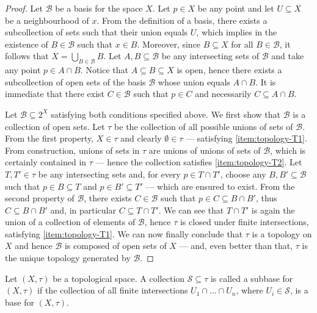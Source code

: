\begin{proof}
Let \(\mathcal{B}\) be a basis for the space \(X\). Let \(p \in X\) be any point
and let \(U \subseteq X\) be a neighbourhood of \(x\). From the definition of a
basis, there exists a subcollection of sets such that their union equals
\(U\), which implies in the existence of \(B \in \mathcal B\) such that \(x \in
B\). Moreover, since \(B \subseteq X\) for all \(B \in \mathcal B\), it follows
that \(X = \bigcup_{B \in \mathcal B} B\). Let \(A, B \subseteq \mathcal B\) be
any intersecting sets of \(\mathcal B\) and take any point \(p \in A \cap
B\). Notice that \(A \subseteq B \subseteq X\) is open, hence there exists a
subcollection of open sets of the basis \(\mathcal B\) whose union equals \(A
\cap B\). It is immediate that there exist \(C \in \mathcal B\) such that \(p
\in C\) and necessarily \(C \subseteq A \cap B\).

Let \(\mathcal B \subseteq 2^X\) satisfying both conditions specified above. We
first show that \(\mathcal B\) is a collection of open sets. Let \(\tau\)
be the collection of all possible unions of sets of \(\mathcal B\). From the
first property, \(X \in \tau\) and clearly \(\emptyset \in \tau\)
--- satisfying \cref{item:topology-T1}. From construction, unions of sets in
\(\tau\) are unions of unions of sets of \(\mathcal B\), which is
certainly contained in \(\tau\) --- hence the collection satisfies
\cref{item:topology-T2}. Let \(T, T' \in \tau\) be any intersecting sets
and, for every \(p \in T \cap T'\), choose any \(B, B' \subseteq \mathcal B\)
such that \(p \in B \subseteq T\) and \(p \in B' \subseteq T'\) --- which are
ensured to exist. From the second property of \(\mathcal B\), there exists \(C
\in \mathcal B\) such that \(p \in C \subseteq B \cap B'\), thus \(C \subseteq B
\cap B'\) and, in particular \(C \subseteq T \cap T'\). We can see that \(T \cap
T'\) is again the union of a collection of elements of \(\mathcal B\), hence
\(\tau\) is closed under finite intersections, satisfying
\cref{item:topology-T1}. We can now finally conclude that \(\tau\) is a
topology on \(X\) and hence \(\mathcal B\) is composed of open sets of \(X\) ---
and, even better than that, \(\tau\) is the unique topology generated by
\(\mathcal B\).
\end{proof}

\begin{definition}[Subbase]\label{def: subbase}
Let \((X, \tau)\) be a topological space. A collection \(\mathcal S
\subseteq \tau\) is called a subbase for \((X, \tau)\) if the
collection of all finite intersections \(U_1 \cap \dots \cap U_n\), where
\(U_i \in \mathcal S\), is a base for \((X, \tau)\).
\end{definition}

